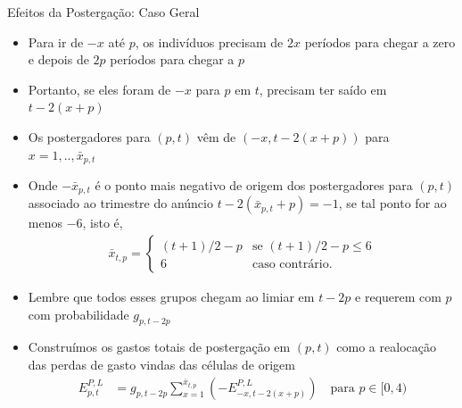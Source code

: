 \begin{frame}{Efeitos da Postergação: Caso Geral}
    \begin{itemize}
        \item Para ir de $-x$ até $p$, os indivíduos precisam de $2x$ períodos para chegar a zero e depois de $2p$ períodos para chegar a $p$
        
        \item Portanto, se eles foram de $-x$ para $p$ em $t$, precisam ter saído em $t-2(x+p)$
        
        \item Os postergadores para $(p,t)$ vêm de $(-x,t-2(x+p))$ para $x=1,..,\bar{x}_{p,t}$
        
        \item Onde $-\bar x_{p,t}$ é o ponto mais negativo de origem dos postergadores para $(p,t)$ associado ao trimestre do anúncio $t-2(\bar x_{p,t}+p)=-1$, se tal ponto for ao menos $-6$, isto é,
        \begin{align*}
            \bar x_{t,p}=\begin{cases}
                (t+1)/2-p & \text{se } (t+1)/2-p\leq 6 \\
                6 & \text{caso contrário.}
            \end{cases}
        \end{align*}
        \item {Lembre que todos esses grupos chegam ao limiar em $t-2p$ e requerem com $p$ com probabilidade $g_{p,t-2p}$}
        \item {Construímos os gastos totais de postergação em $(p,t)$ como a realocação das perdas de gasto vindas das células de origem}
        \begin{align*}
            E^{P,L}_{p,t}
            &=
            g_{p,t-2p}
            \sum_{x=1}^{\bar x_{t,p}}
            \left(
            -E^{P,L}_{-x,t-2(x+p)}
            \right)
            \quad \text{para } p \in [0,4)
        \end{align*}
    \end{itemize}
\end{frame}

